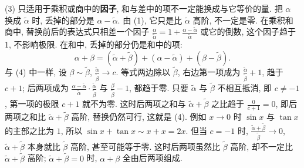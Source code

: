 \documentclass[UTF8,openany]{ctexbook}
\theoremstyle{chinesetextbook}
\begin{document}
(3) 只适用于乘积或商中的\textbf{因子}, 和与差中的项不一定能换成与它等价的量. 把 $\alpha$ 换成 $\widetilde\alpha$ 时, 丢掉的部分是 $\alpha-\widetilde\alpha$. 由 (1), 它只是比 $\widetilde\alpha$ 高阶, 不一定是零. 在乘积和商中, 替换前后的表达式只相差一个因子 $\displaystyle\frac\alpha{\widetilde\alpha}=1+\frac{\alpha-\widetilde\alpha}{\widetilde\alpha}$ 或它的倒数, 这个因子趋于 $1$, 不影响极限. 在和中, 丢掉的部分仍是和中的项:
\[
\alpha+\beta=(\widetilde\alpha+\widetilde\beta)+(\alpha-\widetilde\alpha)+(\beta-\widetilde\beta).
\]
与 (4) 中一样, 设 $\beta\sim\widetilde\beta$, $\displaystyle\frac{\widetilde\alpha}{\widetilde\beta}\to c$. 等式两边除以 $\widetilde\beta$, 右边第一项成为 $\displaystyle\frac{\widetilde\alpha}{\widetilde\beta}+1$, 趋于 $c+1$; 后两项成为 $\displaystyle\frac{\alpha-\widetilde\alpha}{\widetilde\alpha}\cdot\frac{\widetilde\alpha}{\widetilde\beta}$ 与 $\displaystyle\frac\beta{\widetilde\beta}-1$, 都趋于零. 只要 $\widetilde\alpha$ 与 $\widetilde\beta$ 不相互抵消, 即 $c\ne-1$, 第一项的极限 $c+1$ 就不为零. 这时后两项之和与 $\widetilde\alpha+\widetilde\beta$ 之比趋于 $\displaystyle\frac0{c+1}=0$, 即后两项之和比 $\widetilde\alpha+\widetilde\beta$ 高阶, 替换仍然可行, 这就是 (4). 例如 $x\to0$ 时 $\sin x$ 与 $\tan x$ 的主部之比为 $1$, 所以 $\sin x+\tan x\sim x+x=2x$. 但当 $c=-1$ 时, $\displaystyle\frac{\widetilde\alpha+\widetilde\beta}{\widetilde\beta}\to0$, $\widetilde\alpha+\widetilde\beta$ 本身就比 $\widetilde\beta$ 高阶, 甚至可能等于零. 这时后两项虽然比 $\widetilde\beta$ 高阶, 却不一定比 $\widetilde\alpha+\widetilde\beta$ 高阶; $\widetilde\alpha+\widetilde\beta=0$ 时, $\alpha+\beta$ 全由后两项组成.
\end{document}
